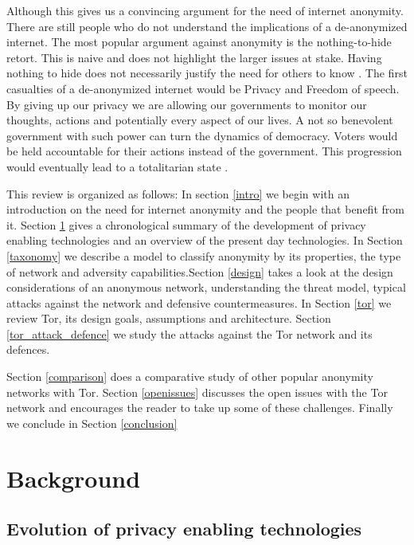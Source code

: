 \documentclass{llncs}
\begin{document}
Although this gives us a convincing argument for the need of internet anonymity. There are still people who do not understand the implications of a de-anonymized internet. The most popular argument against anonymity is the nothing-to-hide retort. This is naive and does not highlight the larger issues at stake. Having nothing to hide does not necessarily justify the need for others to know \cite{thechronicle}. 
The first casualties of a de-anonymized internet would be Privacy and Freedom of speech. By giving up our privacy we are allowing our governments to monitor our thoughts, actions and potentially every aspect of our lives. A not so benevolent government with such power can turn the dynamics of democracy. Voters would be held accountable for their actions instead of the government. This progression would eventually lead to a totalitarian state \cite{privateinternetaccess}. 

This review is organized as follows: In section \ref{intro} we begin with an introduction on the need for internet anonymity and the people that benefit from it. Section \ref{background} gives a chronological summary of the development of privacy enabling technologies and an overview of the present day technologies. In Section \ref{taxonomy} we describe a model to classify anonymity by its properties, the type of network and adversity capabilities.Section \ref{design} takes a look at the design considerations of an anonymous network, understanding the threat model, typical attacks against the network and defensive countermeasures. 
In Section \ref{tor} we review Tor, its design goals, assumptions and architecture. Section \ref{tor_attack_defence} we study the attacks against the Tor network and its defences.

Section \ref{comparison} does a comparative study of other popular anonymity networks with Tor. Section \ref{openissues} discusses the open issues with the Tor network and encourages the reader to take up some of these challenges. Finally we conclude in Section \ref{conclusion}

\section{Background} \label{background}
\subsection{Evolution of privacy enabling technologies}
\end{document}

